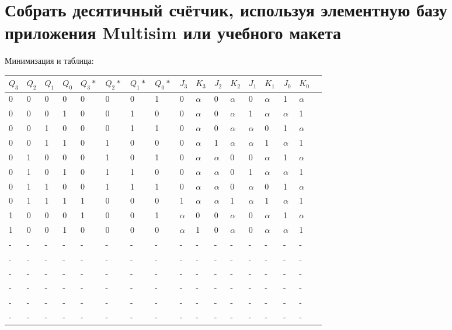 \documentclass[a4paper,12pt]{article}
\begin{document}
\section{Собрать десятичный счётчик, используя элементную базу приложения Multisim или учебного макета}
\noindent Минимизация и таблица:
\begin{center}
	\begin{tabular}{ | l | l | l | l | l | l | l | l | l | l | l | l | l | l | l | l | p{1cm} |}
		\hline
		$Q_{3}$ & $Q_{2}$ & $Q_{1}$ & $Q_{0}$ & $Q_{3}*$ & $Q_{2}*$ & $Q_{1}*$ & $Q_{0}*$ & $J_{3}$ & $K_{3}$ & $J_{2}$ & $K_{2}$ & $J_{1}$ & $K_{1}$ & $J_{0}$ & $K_{0}$ \\\hline
		0 & 0 & 0 & 0 & 0 & 0 & 0 & 1 & 0 & $\alpha$ & 0 & $\alpha$ & 0 & $\alpha$ & 1 & $\alpha$ \\\hline
		0 & 0 & 0 & 1 & 0 & 0 & 1 & 0 & 0 & $\alpha$ & 0 & $\alpha$ & 1 & $\alpha$ & $\alpha$ & 1 \\\hline
		0 & 0 & 1 & 0 & 0 & 0 & 1 & 1 & 0 & $\alpha$ & 0 & $\alpha$ & $\alpha$ & 0 & 1 & $\alpha$ \\\hline
		0 & 0 & 1 & 1 & 0 & 1 & 0 & 0 & 0 & $\alpha$ & 1 & $\alpha$ & $\alpha$ & 1 & $\alpha$ & 1 \\\hline
		0 & 1 & 0 & 0 & 0 & 1 & 0 & 1 & 0 & $\alpha$ & $\alpha$ & 0 & 0 & $\alpha$ & 1 & $\alpha$ \\\hline
		0 & 1 & 0 & 1 & 0 & 1 & 1 & 0 & 0 & $\alpha$ & $\alpha$ & 0 & 1 & $\alpha$ & $\alpha$ & 1 \\\hline
		0 & 1 & 1 & 0 & 0 & 1 & 1 & 1 & 0 & $\alpha$ & $\alpha$ & 0 & $\alpha$ & 0 & 1 & $\alpha$ \\\hline
		0 & 1 & 1 & 1 & 1 & 0 & 0 & 0 & 1 & $\alpha$ & $\alpha$ & 1 & $\alpha$ & 1 & $\alpha$ & 1 \\\hline
		1 & 0 & 0 & 0 & 1 & 0 & 0 & 1 & $\alpha$ & 0 & 0 & $\alpha$ & 0 & $\alpha$ & 1 & $\alpha$ \\\hline
		1 & 0 & 0 & 1 & 0 & 0 & 0 & 0 & $\alpha$ & 1 & 0 & $\alpha$ & 0 & $\alpha$ & $\alpha$ & 1 \\\hline
		- & - & - & - & - & - & - & - & - & - & - & - & - & - & - & - \\\hline
		- & - & - & - & - & - & - & - & - & - & - & - & - & - & - & - \\\hline
		- & - & - & - & - & - & - & - & - & - & - & - & - & - & - & - \\\hline
		- & - & - & - & - & - & - & - & - & - & - & - & - & - & - & - \\\hline
		- & - & - & - & - & - & - & - & - & - & - & - & - & - & - & - \\\hline
		- & - & - & - & - & - & - & - & - & - & - & - & - & - & - & - \\
		\hline
	\end{tabular}


\end{center}
\end{document}
